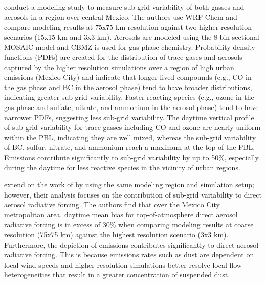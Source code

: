 \cite{qian_investigation_2010} conduct a modeling study to measure sub-grid variability of both gasses and aerosols in a region over central Mexico. The authors use WRF-Chem and compare modeling results at 75x75 km resolution against two higher resolution scenarios (15x15 km and 3x3 km). Aerosols are modeled using the 8-bin sectional MOSAIC model and CBMZ is used for gas phase chemistry. Probability density functions (PDFs) are created for the distribution of trace gases and aerosols captured by the higher resolution simulations over a region of high urban emissions (Mexico City) and indicate that longer-lived compounds (e.g., CO in the gas phase and BC in the aerosol phase) tend to have broader distributions, indicating greater sub-grid variability. Faster reacting species (e.g., ozone in the gas phase and sulfate, nitrate, and ammonium in the aerosol phase) tend to have narrower PDFs, suggesting less sub-grid variability. The daytime vertical profile of sub-grid variability for trace gasses including CO and ozone are nearly uniform within the PBL, indicating they are well mixed, whereas the sub-grid variability of BC, sulfur, nitrate, and ammonium reach a maximum at the top of the PBL. Emissions contribute significantly to sub-grid variability by up to 50\%, especially during the daytime for less reactive species in the vicinity of urban regions. 

\cite{gustafson_jr_downscaling_2011} extend on the work of \cite{qian_investigation_2010} by using the same modeling region and simulation setup; however, their analysis focuses on the contribution of sub-grid variability to direct aerosol radiative forcing. The authors find that over the Mexico City metropolitan area, daytime mean bias for top-of-atmosphere direct aerosol radiative forcing is in excess of 30\% when comparing modeling results at coarse resolution (75x75 km) against the highest resolution scenario (3x3 km). Furthermore, the depiction of emissions contributes significantly to direct aerosol radiative forcing. This is because emissions rates such as dust are dependent on local wind speeds and higher resolution simulations better resolve local flow heterogeneities that result in a greater concentration of suspended dust. 

